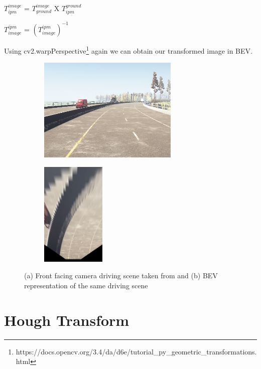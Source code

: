     \begin{center}
    $T^{image}_{ipm}$ = $T^{image}_{ground}$ X $T^{ground}_{ipm}$
    \end{center}
    
    \begin{center}
    $T^{ipm}_{image}$ = $(T^{ipm}_{image})^{-1}$
    \end{center}
    
    Using cv2.warpPerspective\footnote{https://docs.opencv.org/3.4/da/d6e/tutorial_py_geometric_transformations.html} again we can obtain our transformed image in BEV. 
    
    
\begin{figure}[h]
\centering
\begin{subfigure}{0.6\textwidth}
\includegraphics[width=1\linewidth, height=5cm]{images/report_image.jpg} 
\caption{}
\label{fig:subim1}
\end{subfigure}
\begin{subfigure}{0.4\textwidth}
\includegraphics[width=0.5\linewidth, height=5cm]{images/report_image_ipm.jpg}
\caption{}
\label{fig:subim2}
\end{subfigure}

\caption{(a) Front facing camera driving scene taken from \cite{guo2020gen} and (b) BEV representation of the same driving scene}
\label{fig:image2}
\end{figure}
    
    \section{Hough Transform}
    
